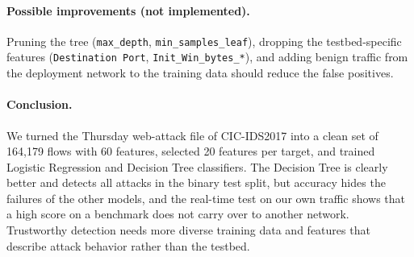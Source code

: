 \paragraph{Possible improvements (not implemented).} Pruning the tree (\texttt{max\_depth}, \texttt{min\_samples\_leaf}), dropping the testbed-specific features (\texttt{Destination Port}, \texttt{Init\_Win\_bytes\_*}), and adding benign traffic from the deployment network to the training data should reduce the false positives.

\paragraph{Conclusion.} We turned the Thursday web-attack file of CIC-IDS2017 into a clean set of 164,179 flows with 60 features, selected 20 features per target, and trained Logistic Regression and Decision Tree classifiers. The Decision Tree is clearly better and detects all attacks in the binary test split, but accuracy hides the failures of the other models, and the real-time test on our own traffic shows that a high score on a benchmark does not carry over to another network. Trustworthy detection needs more diverse training data and features that describe attack behavior rather than the testbed.
